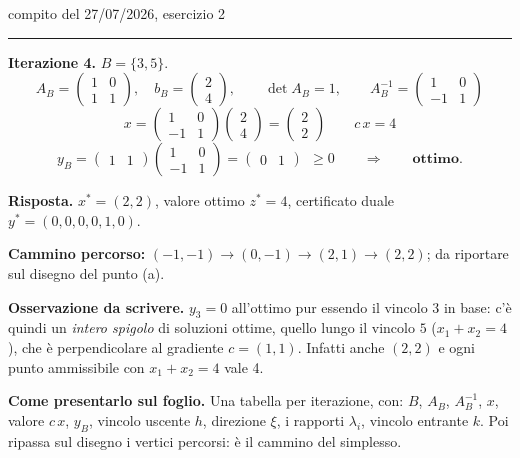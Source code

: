 \documentclass[11pt,a4paper]{article}
\begin{document}
\begin{es}{compito del 27/07/2026, esercizio 2}
\medskip
\hrule
\medskip

\textbf{Iterazione 4.} \quad $B=\{3,5\}$.
\[
A_B = \begin{pmatrix}1 & 0\\ 1 & 1\end{pmatrix},\quad
b_B = \begin{pmatrix}2\\4\end{pmatrix},
\qquad \det A_B = 1,
\qquad
A_B^{-1} = \begin{pmatrix}1 & 0\\ -1 & 1\end{pmatrix}
\]
\[
x = \begin{pmatrix}1&0\\-1&1\end{pmatrix}\begin{pmatrix}2\\4\end{pmatrix} = \begin{pmatrix}2\\2\end{pmatrix}
\qquad c\,x = 4
\]
\[
y_B = \begin{pmatrix}1&1\end{pmatrix}\begin{pmatrix}1&0\\-1&1\end{pmatrix} = \begin{pmatrix}0 & 1\end{pmatrix}
\ \ \ge 0
\qquad\Longrightarrow\qquad \textbf{ottimo.}
\]

\textbf{Risposta.} $x^* = (2,2)$, valore ottimo $z^* = 4$, certificato duale
$y^* = (0,0,0,0,1,0)$.

\textbf{Cammino percorso:} $(-1,-1) \to (0,-1) \to (2,1) \to (2,2)$; da riportare sul disegno
del punto (a).

\textbf{Osservazione da scrivere.} $y_3 = 0$ all'ottimo pur essendo il vincolo $3$ in base:
c'è quindi un \emph{intero spigolo} di soluzioni ottime, quello lungo il vincolo $5$
($x_1+x_2=4$), che è perpendicolare al gradiente $c=(1,1)$.
Infatti anche $(2,2)$ e ogni punto ammissibile con $x_1+x_2=4$ vale 4.
\end{es}

\begin{idea}
\textbf{Come presentarlo sul foglio.} Una tabella per iterazione, con:
$B$, $A_B$, $A_B^{-1}$, $x$, valore $c\,x$, $y_B$, vincolo uscente $h$, direzione $\xi$,
i rapporti $\lambda_i$, vincolo entrante $k$.
Poi ripassa sul disegno i vertici percorsi: è il cammino del simplesso.
\end{idea}
\end{document}
